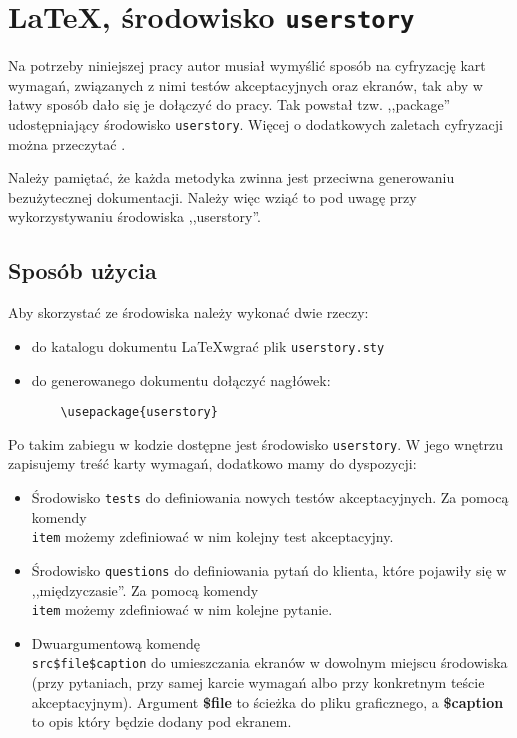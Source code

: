 \chapter{\LaTeX, środowisko \texttt{userstory}}
\label{cha:dodatekA}

Na potrzeby niniejszej pracy autor musiał wymyślić sposób na cyfryzację kart wymagań, związanych z nimi testów akceptacyjnych oraz ekranów, tak aby w łatwy sposób dało się je dołączyć do pracy. Tak powstał tzw. ,,package'' udostępniający środowisko \texttt{userstory}. Więcej o dodatkowych zaletach cyfryzacji można przeczytać .

Należy pamiętać, że każda metodyka zwinna jest przeciwna generowaniu bezużytecznej dokumentacji. Należy więc wziąć to pod uwagę przy wykorzystywaniu środowiska ,,userstory''.

\section{Sposób użycia}
\label{sec:dodatekAsu}

Aby skorzystać ze środowiska należy wykonać dwie rzeczy:
\begin{itemize}
    \item do katalogu dokumentu \LaTeX wgrać plik \texttt{userstory.sty}
    \item do generowanego dokumentu dołączyć nagłówek:
    \begin{lstlisting}
    \usepackage{userstory}
    \end{lstlisting}
\end{itemize}

Po takim zabiegu w kodzie dostępne jest środowisko \texttt{userstory}. W jego wnętrzu zapisujemy treść karty wymagań, dodatkowo mamy do dyspozycji:
\begin{itemize}
    \item Środowisko \texttt{tests} do definiowania nowych testów akceptacyjnych. Za pomocą komendy \texttt{\\item} możemy zdefiniować w nim kolejny test akceptacyjny.
    \item Środowisko \texttt{questions} do definiowania pytań do klienta, które pojawiły się w ,,międzyczasie''. Za pomocą komendy \texttt{\\item} możemy zdefiniować w nim kolejne pytanie.
    \item Dwuargumentową komendę \texttt{\\src{\$file}{\$caption}} do umieszczania ekranów w dowolnym miejscu środowiska (przy pytaniach, przy samej karcie wymagań albo przy konkretnym teście akceptacyjnym). Argument \textbf{\$file} to ścieżka do pliku graficznego, a \textbf{\$caption} to opis który będzie dodany pod ekranem.
\end{itemize}

